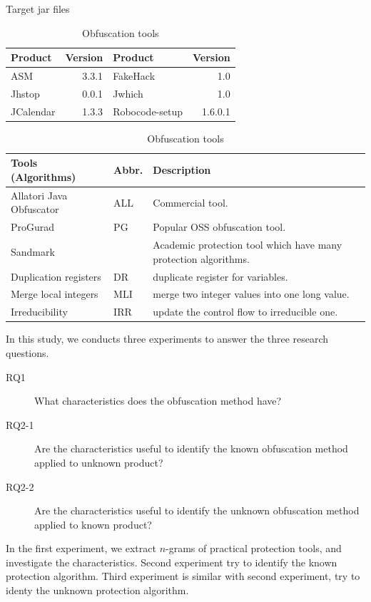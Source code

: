 \documentclass[conference]{IEEEtran}
\begin{document}
\begin{table}[t]
  \centering
  \footnotesize{
    \caption{Target jar files}\label{table:jars}
  \begin{tabular}{l|r||l|r}
    \textbf{Product} & \textbf{Version} & \textbf{Product} & \textbf{Version} \\ \hline
    ASM       & 3.3.1 & FakeHack  & 1.0 \\
    Jhstop    & 0.0.1 & Jwhich    & 1.0  \\
    JCalendar & 1.3.3 & Robocode-setup & 1.6.0.1  \\
  \end{tabular}
  \vspace{0.5cm}
  \caption{Obfuscation tools}\label{table:tools}
  \begin{tabular}{ll|p{4cm}}
      \textbf{Tools (Algorithms)} & \textbf{Abbr.} & \textbf{Description} \\ \hline
      Allatori Java Obfuscator\footnotemark[1] & ALL & Commercial tool. \\ \hline
      ProGurad\footnotemark[2]                 & PG  & Popular OSS obfuscation tool. \\ \hline
      Sandmark\footnotemark[3]                 &     & Academic protection tool which have many protection algorithms. \\
      \hspace{0.1cm} Duplication registers & DR & duplicate register for variables. \\
      \hspace{0.1cm} Merge local integers & MLI & merge two integer values into one long value.\\
      \hspace{0.1cm} Irreducibility       & IRR & update the control flow to irreducible one.\\
  \end{tabular}}
\end{table}

In this study, we conducts three experiments to answer the three
research questions.
\begin{description}
\item[RQ1]   What characteristics does the obfuscation method have?
\item[RQ2-1] Are the characteristics useful to identify the known
  obfuscation method applied to unknown product?
\item[RQ2-2] Are the characteristics useful to identify the unknown
  obfuscation method applied to known product?
\end{description}
In the first experiment, we extract $n$-grams of practical protection
tools, and investigate the characteristics.
%
Second experiment try to identify the known protection algorithm.
Third experiment is similar with second experiment, try to identy the
unknown protection algorithm.
\end{document}
